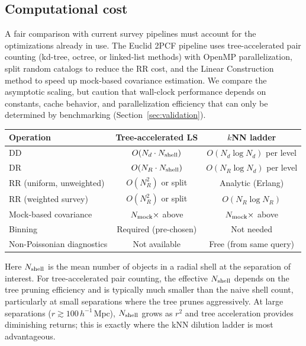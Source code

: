 \subsection{Computational cost}
\label{sec:cost}

A fair comparison with current survey pipelines must account for the optimizations already in use.  The Euclid 2PCF pipeline \citep{EuclidLXXII} uses tree-accelerated pair counting (kd-tree, octree, or linked-list methods) with OpenMP parallelization, split random catalogs to reduce the RR cost, and the Linear Construction method \citep{Keihanen2022} to speed up mock-based covariance estimation.  We compare the asymptotic scaling, but caution that wall-clock performance depends on constants, cache behavior, and parallelization efficiency that can only be determined by benchmarking (Section~\ref{sec:validation}).

\begin{center}
\renewcommand{\arraystretch}{1.15}
\begin{tabular}{@{}lcc@{}}
\toprule
Operation & Tree-accelerated LS & $k$NN ladder \\
\midrule
DD & $O(N_d \cdot N_{\rm shell})$ & $O(N_d \log N_d)$ per level \\
DR & $O(N_R \cdot N_{\rm shell})$ & $O(N_R \log N_d)$ per level \\
RR (uniform, unweighted) & $O(N_R^2)$ or split & Analytic (Erlang) \\
RR (weighted survey) & $O(N_R^2)$ or split & $O(N_R \log N_R)$ \\
Mock-based covariance & $N_{\rm mock} \times$ above & $N_{\rm mock} \times$ above \\
Binning & Required (pre-chosen) & Not needed \\
Non-Poissonian diagnostics & Not available & Free (from same query) \\
\bottomrule
\end{tabular}
\end{center}

Here $N_{\rm shell}$ is the mean number of objects in a radial shell at the separation of interest.  For tree-accelerated pair counting, the effective $N_{\rm shell}$ depends on the tree pruning efficiency and is typically much smaller than the naive shell count, particularly at small separations where the tree prunes aggressively.  At large separations ($r \gtrsim 100\,h^{-1}\,\mathrm{Mpc}$), $N_{\rm shell}$ grows as $r^2$ and tree acceleration provides diminishing returns; this is exactly where the kNN dilution ladder is most advantageous.


